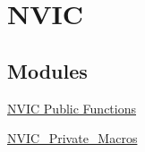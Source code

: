 \hypertarget{group___n_v_i_c}{\section{\-N\-V\-I\-C}
\label{group___n_v_i_c}
}
\subsection*{\-Modules}
\begin{DoxyCompactItemize}
\item 
\hyperlink{group___n_v_i_c___public___functions}{\-N\-V\-I\-C Public Functions}
\item 
\hyperlink{group___n_v_i_c___private___macros}{\-N\-V\-I\-C\-\_\-\-Private\-\_\-\-Macros}
\end{DoxyCompactItemize}

